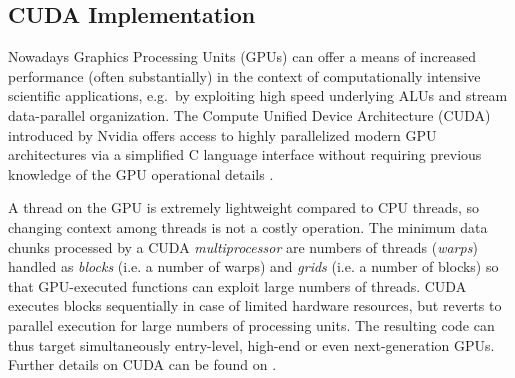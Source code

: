 \documentclass[1p,times]{elsarticle}
\begin{document}
\subsection{CUDA Implementation}
\label{cuda}
Nowadays Graphics Processing Units (GPUs) can offer a means of increased performance 
(often substantially) in the context of computationally intensive scientific applications, 
e.g.\ by exploiting high speed underlying ALUs and stream data-parallel organization. 
The Compute Unified Device Architecture (CUDA) introduced by Nvidia offers access to highly parallelized modern GPU architectures via a
simplified C language interface without requiring previous knowledge of the
GPU operational details \cite{cuda}.

A thread on the GPU is extremely lightweight compared to CPU threads, so changing context among threads is not a costly operation. The minimum 
data chunks processed by a CUDA {\it multiprocessor} are numbers of threads ({\it warps}) handled as {\it blocks} (i.e. a number of warps) and {\it grids} (i.e. a number of blocks) so that GPU-executed functions can exploit large numbers of threads. CUDA executes blocks sequentially
in case of limited hardware resources, but reverts to parallel execution for large numbers 
of processing units.  The resulting code can thus target simultaneously entry-level, high-end or even next-generation GPUs. Further details on CUDA can be found on \cite{cudaprogguide}.

\end{document}
